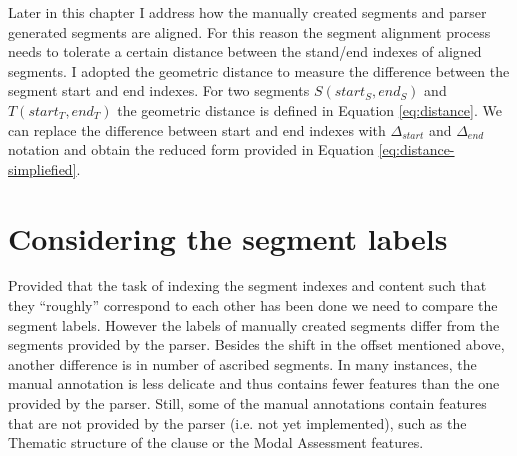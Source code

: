     Later in this chapter I address how the manually created segments and parser generated segments are aligned. 
    For this reason the segment alignment process needs to tolerate a certain distance between the stand/end indexes of aligned segments. I adopted the geometric distance to measure the difference between the segment start and end indexes. For two segments $S(start_S,end_S)$ and $T(start_T,end_T)$ the geometric distance is defined in Equation \ref{eq:distance}. We can replace the difference between start and end indexes with $\varDelta_{start}$ and $\varDelta_{end}$ notation and obtain the reduced form provided in Equation \ref{eq:distance-simpliefied}.

\section{Considering the segment labels}
\label{sec:segment-labels}

    
    Provided that the task of indexing the segment indexes and content such that they ``roughly'' correspond to each other has been done we need to compare the segment labels. However the labels of manually created segments differ from the segments provided by the parser. Besides the shift in the offset mentioned above, another difference is in number of ascribed segments. In many instances, the manual annotation is less delicate and thus contains fewer features than the one provided by the parser. Still, some of the manual annotations contain features that are not provided by the parser (i.e. not yet implemented), such as the Thematic structure of the clause or the Modal Assessment features. 


